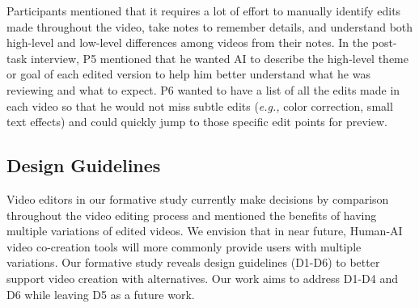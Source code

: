 Participants mentioned that it requires a lot of effort to manually identify edits made throughout the video, take notes to remember details, and understand both high-level and low-level differences among videos from their notes. In the post-task interview, P5 mentioned that he wanted AI to describe the high-level theme or goal of each edited version to help him better understand what he was reviewing and what to expect. P6 wanted to have a list of all the edits made in each video so that he would not miss subtle edits (\textit{e.g.,} color correction, small text effects) and could quickly jump to those specific edit points for preview.



\subsection{Design Guidelines}
Video editors in our formative study currently make decisions by comparison throughout the video editing process and mentioned the benefits of having multiple variations of edited videos. We envision that in near future, Human-AI video co-creation tools will more commonly provide users with multiple variations. 
Our formative study reveals design guidelines (D1-D6) to better support video creation with alternatives. Our work aims to address D1-D4 and D6 while leaving D5 as a future work.


